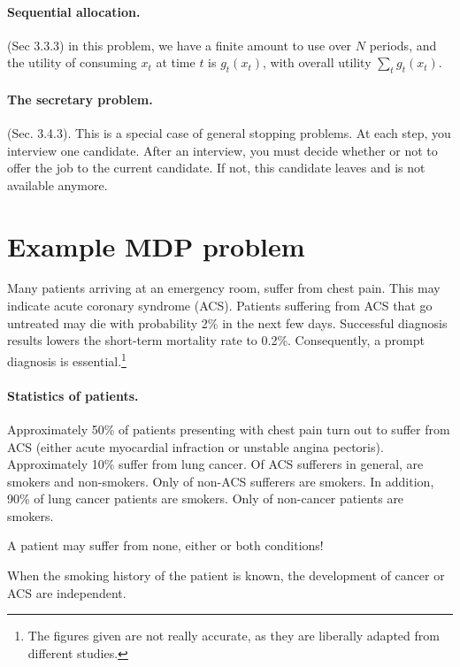 \documentclass[twoside,a4paper]{article}
\begin{document}
  \paragraph{Sequential allocation.} (Sec 3.3.3) in this problem, we have a finite amount to use over $N$ periods, and the utility of consuming $x_t$ at time $t$ is $g_t(x_t)$, with overall utility $\sum_t g_t(x_t)$. 
  \paragraph{The secretary problem.} (Sec. 3.4.3). This is a special case of general stopping problems. At each step, you interview one candidate. After an interview, you must decide whether or not to offer the job to the current candidate. If not, this candidate leaves and is not available anymore.  

\fi
\iffalse

\section{Example MDP problem}

Many patients arriving at an emergency room, suffer from chest pain. This may indicate acute coronary syndrome (ACS). Patients suffering from ACS that go untreated may die with probability 2\% in the next few days. Successful diagnosis results lowers the short-term mortality rate to 0.2\%. Consequently, a prompt diagnosis is essential.\footnote{The figures given are not really accurate, as they are liberally adapted from different studies.}

\paragraph{Statistics of patients.}
Approximately 50\% of patients presenting with chest pain turn out to suffer from ACS (either acute myocardial infraction or unstable angina pectoris). Approximately 10\% suffer from lung cancer. Of ACS sufferers in general,  are smokers and  non-smokers. Only  of non-ACS sufferers are smokers. In addition, 90\% of lung cancer patients are smokers.
Only  of non-cancer patients are smokers.

\begin{assumption}
  A patient may suffer from none, either or both conditions!
\end{assumption}

\begin{assumption}
  When the smoking history of the patient is known, the development of cancer or ACS are independent.
\end{assumption}
\end{document}
